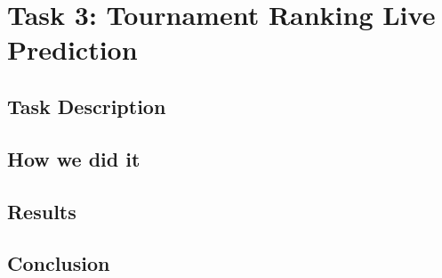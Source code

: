 \section{Task 3: Tournament Ranking Live Prediction}
\subsection{Task Description}
\subsection{How we did it}
\subsection{Results}
\subsection{Conclusion}